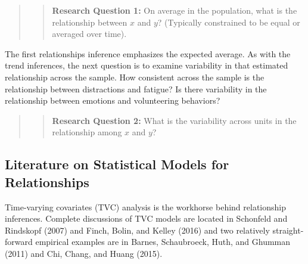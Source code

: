 \documentclass[english,,man]{apa6}
\begin{document}
\begin{quote}
\begin{quote}
\textbf{Research Question 1:} On average in the population, what is the relationship between \(x\) and \(y\)? (Typically constrained to be equal or averaged over time).
\end{quote}
\end{quote}

The first relationships inference emphasizes the expected average. As with the trend inferences, the next question is to examine variability in that estimated relationship across the sample. How consistent across the sample is the relationship between distractions and fatigue? Is there variability in the relationship between emotions and volunteering behaviors?

\begin{quote}
\begin{quote}
\textbf{Research Question 2:} What is the variability across units in the relationship among \(x\) and \(y\)?
\end{quote}
\end{quote}

\hypertarget{literature-on-statistical-models-for-relationships}{%
\subsection{Literature on Statistical Models for Relationships}\label{literature-on-statistical-models-for-relationships}}

Time-varying covariates (TVC) analysis is the workhorse behind relationship inferences. Complete discussions of TVC models are located in Schonfeld and Rindskopf (2007) and Finch, Bolin, and Kelley (2016) and two relatively straight-forward empirical examples are in Barnes, Schaubroeck, Huth, and Ghumman (2011) and Chi, Chang, and Huang (2015).
\end{document}
